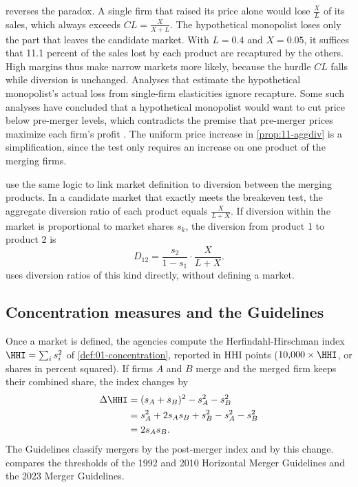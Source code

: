  reverses the paradox. A single firm that raised its price alone would lose
$\frac{X}{L}$ of its sales, which always exceeds $\mathit{CL} = \frac{X}{X + L}$. The hypothetical monopolist loses only
the part that leaves the candidate market. With $L = 0.4$ and $X = 0.05$, it suffices that 11.1 percent of the
sales lost by each product are recaptured by the others. High margins thus make narrow markets more likely,
because the hurdle $\mathit{CL}$ falls while diversion is unchanged. Analyses that estimate the hypothetical
monopolist's actual loss from single-firm elasticities ignore recapture. Some such analyses have concluded that a
hypothetical monopolist would want to cut price below pre-merger levels, which contradicts the premise that
pre-merger prices maximize each firm's profit \citep[p.~25, n.~74]{FarrellShapiro2010}. The uniform price
increase in \cref{prop:11-aggdiv} is a simplification, since the test only requires an increase on one product of
the merging firms.

\citet[Appendix]{FarrellShapiro2010} use the same logic to link market definition to diversion between the
merging products. In a candidate market that exactly meets the breakeven test, the aggregate diversion ratio of
each product equals $\frac{X}{L + X}$. If diversion within the market is proportional to market shares $s_k$, the
diversion from product 1 to product 2 is
\begin{equation}\label{eq:11-fs-proxy}
D_{12} = \frac{s_2}{1 - s_1}\cdot\frac{X}{L + X}.
\end{equation}
 uses diversion ratios of this kind directly, without defining a market.

\subsection{Concentration measures and the Guidelines}\label{sec:11-hhi}

Once a market is defined, the agencies compute the Herfindahl-Hirschman index $\HHI = \sum_i s_i^2$ of
\cref{def:01-concentration}, reported in HHI points ($10{,}000 \times \HHI$, or shares in percent squared). If
firms $A$ and $B$ merge and the merged firm keeps their combined share, the index changes by
\begin{align}
\Delta\HHI &= (s_A + s_B)^2 - s_A^2 - s_B^2 \notag \\
&= s_A^2 + 2 s_A s_B + s_B^2 - s_A^2 - s_B^2 \notag \\
&= 2 s_A s_B. \label{eq:11-dhhi}
\end{align}
The Guidelines classify mergers by the post-merger index and by this change.  compares
the thresholds of the 1992 and 2010 Horizontal Merger Guidelines and the 2023 Merger Guidelines.

